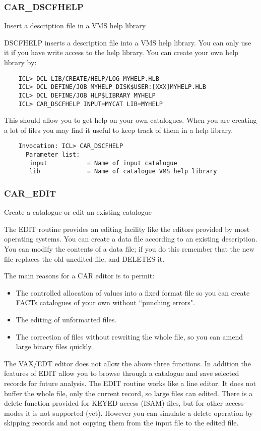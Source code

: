 \subsubsection{CAR\_DSCFHELP}

Insert a description file in a VMS help library

DSCFHELP inserts a description file into a VMS help library.
You can only use it if you have write access to the help library.
You can create your own help library by:
\begin{verbatim}
    ICL> DCL LIB/CREATE/HELP/LOG MYHELP.HLB
    ICL> DCL DEFINE/JOB MYHELP DISK$USER:[XXX]MYHELP.HLB
    ICL> DCL DEFINE/JOB HLP$LIBRARY MYHELP
    ICL> CAR_DSCFHELP INPUT=MYCAT LIB=MYHELP
\end{verbatim}
This should allow you to get help on your own catalogues.
When you are creating a lot of files you may find it useful to
keep track of them in a help library.
\begin{verbatim}
    Invocation: ICL> CAR_DSCFHELP
      Parameter list:
       input           = Name of input catalogue
       lib             = Name of catalogue VMS help library
\end{verbatim}

\subsubsection{CAR\_EDIT}

Create a catalogue or edit an existing catalogue

The EDIT routine provides an editing facility like the editors
provided by most operating systems.
You can create a data file according to an existing description.
You can modify the contents of a data file; if you do this remember
that the new file replaces the old unedited file, and DELETES it.

The main reasons for a CAR editor is to permit:
\begin{itemize}
\item The controlled allocation of values into a fixed format file so you 
can create FACTs catalogues of your own without ``punching errors".
\item The editing of unformatted files.
\item The correction of files without rewriting the whole file, so you 
can amend large binary files quickly.
\end{itemize}
The VAX/EDT editor does not allow the above three functions.
In addition the features of EDIT allow you to browse through a
catalogue and save selected records for future analysis.
The EDIT routine works like a line editor. 
It does not buffer the whole file, only the current record, so large 
files can edited.
There is a delete function provided for KEYED access (ISAM) files,
but for other access modes it is not supported (yet). 
However you can simulate a delete operation by skipping records and not 
copying them from the input file to the edited file.

